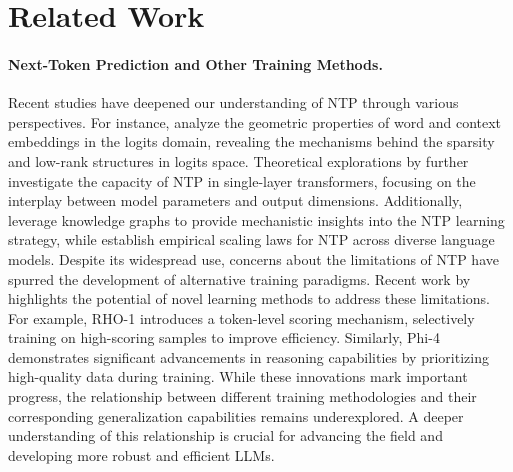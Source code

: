 \section{Related Work}
\paragraph{Next-Token Prediction and Other Training Methods.}
Recent studies have deepened our understanding of NTP through various perspectives. For instance, \citep{zhao2024implicit, thrampoulidisimplicit} analyze the geometric properties of word and context embeddings in the logits domain, revealing the mechanisms behind the sparsity and low-rank structures in logits space. Theoretical explorations by \citep{madden2024nexttokenpredictioncapacitygeneral} further investigate the capacity of NTP in single-layer transformers, focusing on the interplay between model parameters and output dimensions. Additionally, \citep{MechanicsofNextTokenPredictionwithSelf-Attention} leverage knowledge graphs to provide mechanistic insights into the NTP learning strategy, while \citep{heLawNextTokenPrediction2024} establish empirical scaling laws for NTP across diverse language models. Despite its widespread use, concerns about the limitations of NTP have spurred the development of alternative training paradigms. Recent work by \citep{pmlr-v235-bachmann24a, gloeckle2024better} highlights the potential of novel learning methods to address these limitations. For example, RHO-1 \citep{rho1} introduces a token-level scoring mechanism, selectively training on high-scoring samples to improve efficiency. Similarly, Phi-4 \citep{abdin2024phi4technicalreport} demonstrates significant advancements in reasoning capabilities by prioritizing high-quality data during training. While these innovations mark important progress, the relationship between different training methodologies and their corresponding generalization capabilities remains underexplored. A deeper understanding of this relationship is crucial for advancing the field and developing more robust and efficient LLMs.


